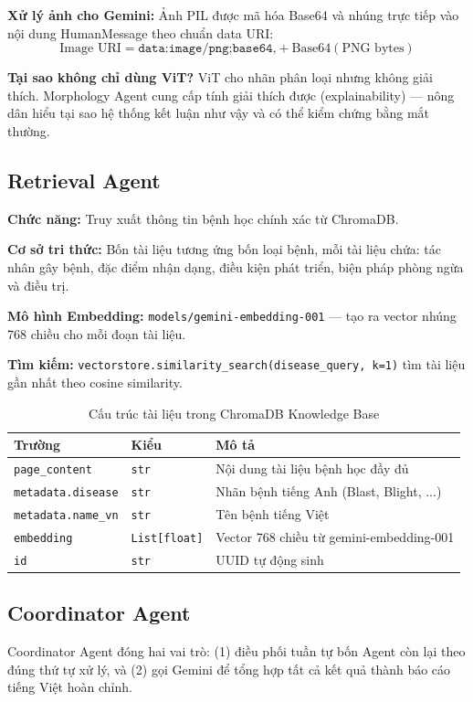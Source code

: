 \documentclass[13pt,a4paper]{extreport}
\begin{document}
\textbf{Xử lý ảnh cho Gemini:} Ảnh PIL được mã hóa Base64 và nhúng trực tiếp vào nội dung HumanMessage theo chuẩn data URI:
\begin{equation}
    \text{Image URI} = \texttt{data:image/png;base64,} + \text{Base64}(\text{PNG bytes})
\end{equation}

\textbf{Tại sao không chỉ dùng ViT?} ViT cho nhãn phân loại nhưng không giải thích. Morphology Agent cung cấp tính giải thích được (explainability) --- nông dân hiểu tại sao hệ thống kết luận như vậy và có thể kiểm chứng bằng mắt thường.

\subsection{Retrieval Agent}
\textbf{Chức năng:} Truy xuất thông tin bệnh học chính xác từ ChromaDB.

\textbf{Cơ sở tri thức:} Bốn tài liệu tương ứng bốn loại bệnh, mỗi tài liệu chứa: tác nhân gây bệnh, đặc điểm nhận dạng, điều kiện phát triển, biện pháp phòng ngừa và điều trị.

\textbf{Mô hình Embedding:} \texttt{models/gemini-embedding-001} --- tạo ra vector nhúng 768 chiều cho mỗi đoạn tài liệu.

\textbf{Tìm kiếm:} \texttt{vectorstore.similarity\_search(disease\_query, k=1)} tìm tài liệu gần nhất theo cosine similarity.

\begin{table}[H]
\centering
\caption{Cấu trúc tài liệu trong ChromaDB Knowledge Base}
\label{tab:chromadb_schema}
\begin{tabular}{lll}
\toprule
\textbf{Trường} & \textbf{Kiểu} & \textbf{Mô tả} \\
\midrule
\texttt{page\_content} & \texttt{str} & Nội dung tài liệu bệnh học đầy đủ \\
\texttt{metadata.disease} & \texttt{str} & Nhãn bệnh tiếng Anh (Blast, Blight, ...) \\
\texttt{metadata.name\_vn} & \texttt{str} & Tên bệnh tiếng Việt \\
\texttt{embedding} & \texttt{List[float]} & Vector 768 chiều từ gemini-embedding-001 \\
\texttt{id} & \texttt{str} & UUID tự động sinh \\
\bottomrule
\end{tabular}
\end{table}

\subsection{Coordinator Agent}
Coordinator Agent đóng hai vai trò: (1) điều phối tuần tự bốn Agent còn lại theo đúng thứ tự xử lý, và (2) gọi Gemini để tổng hợp tất cả kết quả thành báo cáo tiếng Việt hoàn chỉnh.
\end{document}
